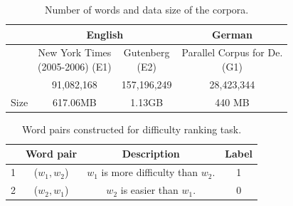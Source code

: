 \begin{table}[th]
	\begin{center}
		\scriptsize
		\begin{tabular}{|c|c|c||c|}
			\hline
			\textbf{} & \multicolumn{2}{c||}{\textbf{English}} & \textbf{German} \\ \hline
			& \tabincell{c}{New York Times\\(2005-2006) (E1)}       & \tabincell{c}{Gutenberg \\ (E2)}   & \tabincell{c}{Parallel Corpus for De. \\(G1)} \\ \hline
			\tabincell{c}{Words}   & 91,082,168          & 157,196,249   & 28,423,344               \\ \hline
			Size        & 617.06MB  & 1.13GB         & 440 MB          \\ \hline
		\end{tabular}
	\end{center}
\vspace{-0.25cm}
	\caption{\label{tab:corpus} Number of words and data size of the corpora.}
\end{table}
\vspace{-0.5cm}
\begin{table}[ht]
	\scriptsize
	\begin{center}
		\begin{tabular}{|c|c|c|c|}
			\hline
			& \textbf{Word pair} & \textbf{Description} & \textbf{Label} \\ \hline
			1 & ($w_1, w_2$) & $w_1$ is more difficulty than $w_2$. & 1 \\ \hline
			2 & ($w_2, w_1$) & $w_2$ is easier than $w_1$. & 0 \\ \hline
		\end{tabular}
	\end{center}
	\vspace{-0.25cm}
	\caption{\label{tab:pairs} Word pairs constructed for difficulty ranking task.}
\end{table}

